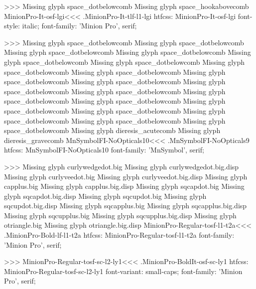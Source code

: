 {>>>
Missing glyph	space_dotbelowcomb
Missing glyph	space_hookabovecomb
\<MinionPro-It-osf-lgi\><<<
.MinionPro-It-tlf-l1-lgi
htfcss:  MinionPro-It-osf-lgi  font-style: italic; font-family: 'Minion Pro', serif;

>>>
Missing glyph	space_dotbelowcomb
Missing glyph	space_dotbelowcomb
Missing glyph	space_dotbelowcomb
Missing glyph	space_dotbelowcomb
Missing glyph	space_dotbelowcomb
Missing glyph	space_dotbelowcomb
Missing glyph	space_dotbelowcomb
Missing glyph	space_dotbelowcomb
Missing glyph	space_dotbelowcomb
Missing glyph	space_dotbelowcomb
Missing glyph	space_dotbelowcomb
Missing glyph	space_dotbelowcomb
Missing glyph	space_dotbelowcomb
Missing glyph	space_dotbelowcomb
Missing glyph	space_dotbelowcomb
Missing glyph	space_dotbelowcomb
Missing glyph	space_dotbelowcomb
Missing glyph	space_dotbelowcomb
Missing glyph	space_dotbelowcomb
Missing glyph	dieresis_acutecomb
Missing glyph	dieresis_gravecomb
\<MnSymbolFI-NoOpticals10\><<<
.MnSymbolFI-NoOpticals9
htfcss:  MnSymbolFI-NoOpticals10  font-family: 'MnSymbol', serif;

>>>
Missing glyph	curlywedgedot.big
Missing glyph	curlywedgedot.big.disp
Missing glyph	curlyveedot.big
Missing glyph	curlyveedot.big.disp
Missing glyph	capplus.big
Missing glyph	capplus.big.disp
Missing glyph	sqcapdot.big
Missing glyph	sqcapdot.big.disp
Missing glyph	sqcupdot.big
Missing glyph	sqcupdot.big.disp
Missing glyph	sqcapplus.big
Missing glyph	sqcapplus.big.disp
Missing glyph	sqcupplus.big
Missing glyph	sqcupplus.big.disp
Missing glyph	otriangle.big
Missing glyph	otriangle.big.disp
\<MinionPro-Regular-tosf-l1-t2a\><<<
.MinionPro-Bold-lf-l1-t2a
htfcss:  MinionPro-Regular-tosf-l1-t2a  font-family: 'Minion Pro', serif;

>>>
\<MinionPro-Regular-tosf-sc-l2-ly1\><<<
.MinionPro-BoldIt-osf-sc-ly1
htfcss:  MinionPro-Regular-tosf-sc-l2-ly1  font-variant: small-caps; font-family: 'Minion Pro', serif;

}
